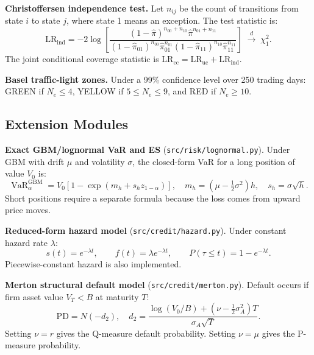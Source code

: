 \documentclass[11pt]{article}
\newcommand{\code}[1]{\texttt{#1}}
\DeclareMathOperator{\VaR}{VaR}
\begin{document}
\textbf{Christoffersen independence test.}  Let $n_{ij}$ be the count of
transitions from state $i$ to state $j$, where state 1 means an exception.
The test statistic is:
\begin{equation}
  \mathrm{LR}_{\mathrm{ind}}
    = -2\log\!\left[\frac{(1-\hat{\pi})^{n_{00}+n_{10}}
                          \hat{\pi}^{n_{01}+n_{11}}}
                         {(1-\hat{\pi}_{01})^{n_{00}}\hat{\pi}_{01}^{n_{01}}
                          (1-\hat{\pi}_{11})^{n_{10}}\hat{\pi}_{11}^{n_{11}}}\right]
    \;\xrightarrow{d}\; \chi^2_1.
  \label{eq:christoffersen}
\end{equation}
The joint conditional coverage statistic is
$\mathrm{LR}_{\mathrm{cc}} = \mathrm{LR}_{\mathrm{uc}} + \mathrm{LR}_{\mathrm{ind}}$.

\textbf{Basel traffic-light zones.}  Under a 99\% confidence level over
250 trading days: GREEN if $N_e \leq 4$, YELLOW if $5 \leq N_e \leq 9$,
and RED if $N_e \geq 10$.

\subsection{Extension Modules}
\label{sec:extensions}

\textbf{Exact GBM/lognormal VaR and ES} (\code{src/risk/lognormal.py}).
Under GBM with drift $\mu$ and volatility $\sigma$, the closed-form VaR
for a long position of value $V_0$ is:
\begin{equation}
  \VaR_\alpha^{\mathrm{GBM}} =
  V_0\!\left[1 - \exp\!\left(m_h + s_h z_{1-\alpha}\right)\right],
  \quad
  m_h = \left(\mu - \tfrac{1}{2}\sigma^2\right)h,
  \quad
  s_h = \sigma\sqrt{h}.
  \label{eq:gbm_var}
\end{equation}
Short positions require a separate formula because the loss comes from
upward price moves.

\textbf{Reduced-form hazard model} (\code{src/credit/hazard.py}).  Under
constant hazard rate $\lambda$:
\begin{equation}
  s(t) = e^{-\lambda t},
  \qquad
  f(t) = \lambda e^{-\lambda t},
  \qquad
  P(\tau \leq t) = 1 - e^{-\lambda t}.
\end{equation}
Piecewise-constant hazard is also implemented.

\textbf{Merton structural default model} (\code{src/credit/merton.py}).
Default occurs if firm asset value $V_T < B$ at maturity $T$:
\begin{equation}
  \mathrm{PD} = N(-d_2),
  \quad
  d_2 =
  \frac{\log(V_0/B) + (\nu - \tfrac{1}{2}\sigma_A^2)T}
       {\sigma_A\sqrt{T}}.
\end{equation}
Setting $\nu=r$ gives the Q-measure default probability.  Setting
$\nu=\mu$ gives the P-measure probability.
\end{document}
